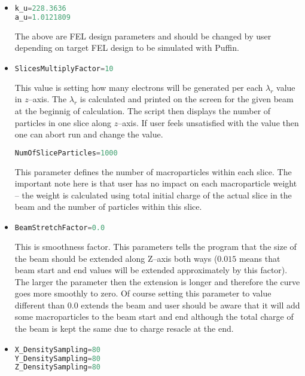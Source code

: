 \documentclass[12pt]{article}
\begin{document}
\begin{itemize}

\item
\begin{lstlisting}[language=Python]
k_u=228.3636
a_u=1.0121809
\end{lstlisting}
The above are FEL design parameters and should be changed by user depending on target FEL design to be simulated with Puffin.

\item
\begin{lstlisting}[language=Python]
SlicesMultiplyFactor=10
\end{lstlisting}
This value is setting how many electrons will be generated per each $\lambda_{r}$ value in $z$--axis. The $\lambda_{r}$ is calculated and printed on the screen for the given beam at the beginnig of calculation. The script then displays the number of particles in one slice along $z$--axis. If user feels unsatisfied with the value then one can abort run and change the value. 

\begin{lstlisting}[language=Python]
NumOfSliceParticles=1000
\end{lstlisting}
This parameter defines the number of macroparticles within each slice. The important note here is that user has no impact on each macroparticle weight -- the weight is calculated using total initial charge of the actual slice in the beam and the number of particles within this slice.

\item
\begin{lstlisting}[language=Python]
BeamStretchFactor=0.0
\end{lstlisting}
This is smoothness factor. This parameters tells the program that the size of the beam should be extended along Z--axis both ways ($0.015$ means that beam start and end values will be extended approximately by this factor). The larger the parameter then the extension is longer and therefore the curve goes more smoothly to zero. Of course setting this parameter to value different than $0.0$ extends the beam and user should be aware that it will add some macroparticles to the beam start and end although the total charge of the beam is kept the same due to charge resacle at the end. 

\item
\begin{lstlisting}[language=Python]
X_DensitySampling=80
Y_DensitySampling=80
Z_DensitySampling=80
\end{lstlisting}


\end{itemize}
\end{document}
